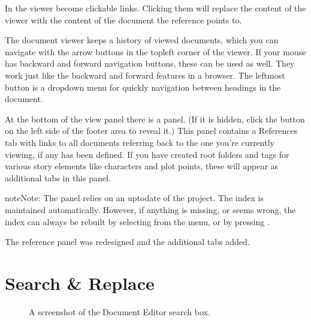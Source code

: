 \documentclass[a4paper,11pt,english]{sphinxmanual}
\begin{document}
\sphinxAtStartPar
In the viewer {\hyperref[\detokenize{int_glossary:term-Reference}]{}} become clickable links. Clicking them will replace the
content of the viewer with the content of the document the reference points to.

\sphinxAtStartPar
The document viewer keeps a history of viewed documents, which you can navigate with the arrow
buttons in the top\textendash{}left corner of the viewer. If your mouse has backward and forward navigation
buttons, these can be used as well. They work just like the backward and forward features in a
browser. The left\sphinxhyphen{}most button is a dropdown menu for quickly navigation between headings in the
document.

\sphinxAtStartPar
At the bottom of the view panel there is a  panel. (If it is hidden, click the button
on the left side of the footer area to reveal it.) This panel contains a References tab with links
to all documents referring back to the one you’re currently viewing, if any has been defined. If
you have created root folders and tags for various story elements like characters and plot points,
these will appear as additional tabs in this panel.

\begin{sphinxadmonition}{note}{Note:}
\sphinxAtStartPar
The  panel relies on an up\sphinxhyphen{}to\sphinxhyphen{}date {\hyperref[\detokenize{int_glossary:term-Project-Index}]{}} of the project.
The index is maintained automatically. However, if anything is missing, or seems wrong, the
index can always be rebuilt by selecting  from the  menu, or by
pressing .
\end{sphinxadmonition}

\sphinxAtStartPar
{}The reference panel was redesigned and the additional tabs added.


\section{Search \& Replace}
\label{\detokenize{usage_writing:search-replace}}\label{\detokenize{usage_writing:a-ui-edit-search}}
\begin{figure}[htbp]
\centering
\capstart

\noindent{}
\caption{A screenshot of the Document Editor search box.}\label{\detokenize{usage_writing:id3}}\end{figure}
\end{document}
